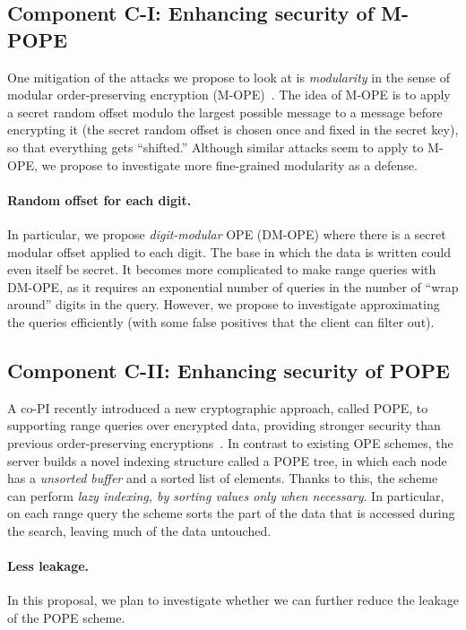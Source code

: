 

\subsection{Component C-I:  Enhancing security of M-POPE}
One mitigation of the attacks we propose to look at is \emph{modularity} in the
sense of modular order-preserving encryption (M-OPE)~\cite{C:BolCheOne11}.  The
idea of M-OPE is to apply a secret random offset modulo the largest possible
message to a message before encrypting it (the secret random offset is chosen
once and fixed in the secret key), so that everything gets ``shifted.''
Although similar attacks seem to apply to M-OPE, we propose to investigate more
fine-grained modularity as a defense. 

\paragraph{Random offset for each digit.}
In particular, we propose \emph{digit-modular} OPE (DM-OPE) where there is a
secret modular offset applied to each digit.  The base in which the data is
written could even itself be secret.  It becomes more complicated to make range
queries with DM-OPE, as it requires an exponential number of queries in the
number of ``wrap around'' digits in the query.  However, we propose to
investigate approximating the queries efficiently (with some false positives
that the client can filter out).


\subsection{Component C-II:  Enhancing security of POPE}
A co-PI recently introduced a new cryptographic approach, called POPE, to
supporting range queries over encrypted data, providing stronger security than
previous order-preserving encryptions~\cite{CCS:RACY16}.  In contrast to
existing OPE schemes, the server builds a novel indexing structure called a
POPE tree, in which each node has a {\it unsorted buffer} and a sorted list of
elements.  Thanks to this, the scheme can perform {\it lazy indexing, by
sorting values only when necessary}. In particular, on each range query the
scheme sorts the part of the data that is accessed during the search, leaving
much of the data untouched.

\paragraph{Less leakage.}
In this proposal, we plan to investigate whether we can further reduce the
leakage of the POPE scheme. 

